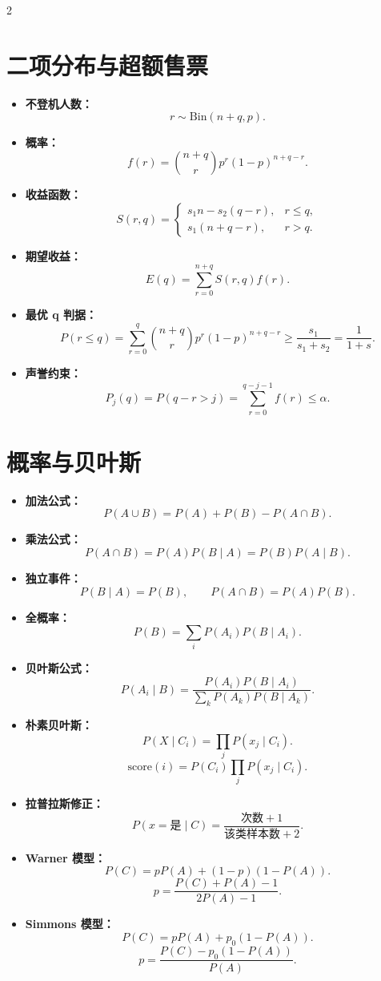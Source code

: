 \documentclass[UTF8,fontset=windows,10pt,a4paper]{ctexart}
\newcommand{\tagline}[1]{\textbf{\color{blue!60!black}#1：}}
\begin{document}
\begin{multicols}{2}
\section{二项分布与超额售票}
\begin{itemize}
  \item \tagline{不登机人数}
  \[
    r\sim \mathrm{Bin}(n+q,p).
  \]
  \item \tagline{概率}
  \[
    f(r)=\binom{n+q}{r}p^r(1-p)^{n+q-r}.
  \]
  \item \tagline{收益函数}
  \[
    S(r,q)=
    \begin{cases}
    s_1n-s_2(q-r), & r\le q,\\
    s_1(n+q-r), & r>q.
    \end{cases}
  \]
  \item \tagline{期望收益}
  \[
    E(q)=\sum_{r=0}^{n+q}S(r,q)f(r).
  \]
  \item \tagline{最优 q 判据}
  \[
    P(r\le q)=\sum_{r=0}^{q}\binom{n+q}{r}p^r(1-p)^{n+q-r}
    \ge \frac{s_1}{s_1+s_2}=\frac1{1+s}.
  \]
  \item \tagline{声誉约束}
  \[
    P_j(q)=P(q-r>j)=\sum_{r=0}^{q-j-1}f(r)\le \alpha.
  \]
\end{itemize}

\section{概率与贝叶斯}
\begin{itemize}
  \item \tagline{加法公式}
  \[
    P(A\cup B)=P(A)+P(B)-P(A\cap B).
  \]
  \item \tagline{乘法公式}
  \[
    P(A\cap B)=P(A)P(B\mid A)=P(B)P(A\mid B).
  \]
  \item \tagline{独立事件}
  \[
    P(B\mid A)=P(B),\qquad P(A\cap B)=P(A)P(B).
  \]
  \item \tagline{全概率}
  \[
    P(B)=\sum_i P(A_i)P(B\mid A_i).
  \]
  \item \tagline{贝叶斯公式}
  \[
    P(A_i\mid B)=
    \frac{P(A_i)P(B\mid A_i)}
    {\sum_kP(A_k)P(B\mid A_k)}.
  \]
  \item \tagline{朴素贝叶斯}
  \[
    P(X\mid C_i)=\prod_jP(x_j\mid C_i).
  \]
  \[
    \mathrm{score}(i)=P(C_i)\prod_jP(x_j\mid C_i).
  \]
  \item \tagline{拉普拉斯修正}
  \[
    P(x=\text{是}\mid C)=\frac{\text{次数}+1}{\text{该类样本数}+2}.
  \]
  \item \tagline{Warner 模型}
  \[
    P(C)=pP(A)+(1-p)(1-P(A)).
  \]
  \[
    p=\frac{P(C)+P(A)-1}{2P(A)-1}.
  \]
  \item \tagline{Simmons 模型}
  \[
    P(C)=pP(A)+p_0(1-P(A)).
  \]
  \[
    p=\frac{P(C)-p_0(1-P(A))}{P(A)}.
  \]
\end{itemize}


\end{multicols}
\end{document}
